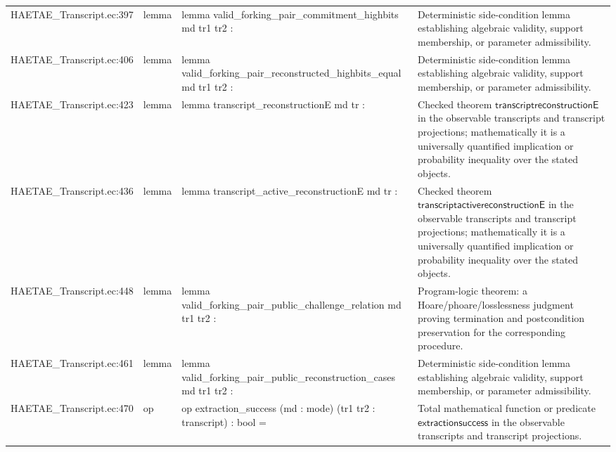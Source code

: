 \documentclass[10pt]{article}
\begin{document}
\begin{longtable}{L{0.11\textwidth}L{0.055\textwidth}L{0.385\textwidth}L{0.41\textwidth}}
HAETAE\_\allowbreak{}Transcript.\allowbreak{}ec:\allowbreak{}397 & lemma & {\ttfamily\scriptsize lemma valid\_\allowbreak{}forking\_\allowbreak{}pair\_\allowbreak{}commitment\_\allowbreak{}highbits md tr1 tr2 :} & Deterministic side-condition lemma establishing algebraic validity, support membership, or parameter admissibility. \\
HAETAE\_\allowbreak{}Transcript.\allowbreak{}ec:\allowbreak{}406 & lemma & {\ttfamily\scriptsize lemma valid\_\allowbreak{}forking\_\allowbreak{}pair\_\allowbreak{}reconstructed\_\allowbreak{}highbits\_\allowbreak{}equal md tr1 tr2 :} & Deterministic side-condition lemma establishing algebraic validity, support membership, or parameter admissibility. \\
HAETAE\_\allowbreak{}Transcript.\allowbreak{}ec:\allowbreak{}423 & lemma & {\ttfamily\scriptsize lemma transcript\_\allowbreak{}reconstructionE md tr :} & Checked theorem $\mathsf{transcriptreconstructionE}$ in the observable transcripts and transcript projections; mathematically it is a universally quantified implication or probability inequality over the stated objects. \\
HAETAE\_\allowbreak{}Transcript.\allowbreak{}ec:\allowbreak{}436 & lemma & {\ttfamily\scriptsize lemma transcript\_\allowbreak{}active\_\allowbreak{}reconstructionE md tr :} & Checked theorem $\mathsf{transcriptactivereconstructionE}$ in the observable transcripts and transcript projections; mathematically it is a universally quantified implication or probability inequality over the stated objects. \\
HAETAE\_\allowbreak{}Transcript.\allowbreak{}ec:\allowbreak{}448 & lemma & {\ttfamily\scriptsize lemma valid\_\allowbreak{}forking\_\allowbreak{}pair\_\allowbreak{}public\_\allowbreak{}challenge\_\allowbreak{}relation md tr1 tr2 :} & Program-logic theorem: a Hoare/phoare/losslessness judgment proving termination and postcondition preservation for the corresponding procedure. \\
HAETAE\_\allowbreak{}Transcript.\allowbreak{}ec:\allowbreak{}461 & lemma & {\ttfamily\scriptsize lemma valid\_\allowbreak{}forking\_\allowbreak{}pair\_\allowbreak{}public\_\allowbreak{}reconstruction\_\allowbreak{}cases md tr1 tr2 :} & Deterministic side-condition lemma establishing algebraic validity, support membership, or parameter admissibility. \\
HAETAE\_\allowbreak{}Transcript.\allowbreak{}ec:\allowbreak{}470 & op & {\ttfamily\scriptsize op extraction\_\allowbreak{}success (md : mode) (tr1 tr2 : transcript) : bool =} & Total mathematical function or predicate $\mathsf{extractionsuccess}$ in the observable transcripts and transcript projections. \\

\end{longtable}
\end{document}
